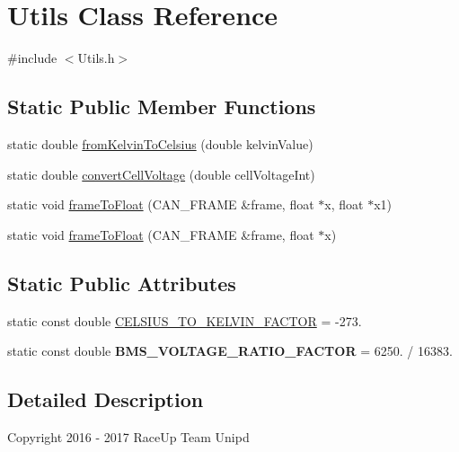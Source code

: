 \hypertarget{class_utils}{}\section{Utils Class Reference}
\label{class_utils}


{\ttfamily \#include $<$Utils.\+h$>$}

\subsection*{Static Public Member Functions}
\begin{DoxyCompactItemize}
\item 
static double \hyperlink{class_utils_a393f44e0230724e5cd3b7c125b16b5e1}{from\+Kelvin\+To\+Celsius} (double kelvin\+Value)
\item 
static double \hyperlink{class_utils_a70e2b7f69e19a166352387194f83a13c}{convert\+Cell\+Voltage} (double cell\+Voltage\+Int)
\item 
static void \hyperlink{class_utils_af819499b6a69f2aed478a2945bedc56b}{frame\+To\+Float} (C\+A\+N\+\_\+\+F\+R\+A\+ME \&frame, float $\ast$x, float $\ast$x1)
\item 
static void \hyperlink{class_utils_aa3f908c62401cc150a33ac791e0fa1c1}{frame\+To\+Float} (C\+A\+N\+\_\+\+F\+R\+A\+ME \&frame, float $\ast$x)
\end{DoxyCompactItemize}
\subsection*{Static Public Attributes}
\begin{DoxyCompactItemize}
\item 
static const double \hyperlink{class_utils_af916f41aa01c118944d9dd91fea3584e}{C\+E\+L\+S\+I\+U\+S\+\_\+\+T\+O\+\_\+\+K\+E\+L\+V\+I\+N\+\_\+\+F\+A\+C\+T\+OR} = -\/273.
\item 
static const double {\bfseries B\+M\+S\+\_\+\+V\+O\+L\+T\+A\+G\+E\+\_\+\+R\+A\+T\+I\+O\+\_\+\+F\+A\+C\+T\+OR} = 6250. / 16383.\hypertarget{class_utils_a1a92d9c2edea3e4b3abd48994a4475fa}{}\label{class_utils_a1a92d9c2edea3e4b3abd48994a4475fa}

\end{DoxyCompactItemize}


\subsection{Detailed Description}
Copyright 2016 -\/ 2017 Race\+Up Team Unipd

